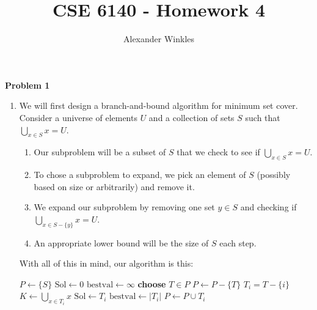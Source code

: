 \documentclass{article}
\title{CSE 6140 - Homework 4}
\author{Alexander Winkles}
\date{}
\newcommand{\Problem}[1]{\textbf{\large Problem #1}}
\begin{document}
\maketitle

\vspace{2in}



\newpage

\Problem{1}

\begin{enumerate}
\item We will first design a branch-and-bound algorithm for minimum set cover.
Consider a universe of elements $U$ and a collection of sets $S$ such that $\bigcup_{x \in S} x = U$. 
\begin{enumerate}
\item Our subproblem will be a subset of $S$ that we check to see if $\bigcup_{x \in S} x = U$.
\item To chose a subproblem to expand, we pick an element of $S$ (possibly based on size or arbitrarily) and remove it. 
\item We expand our subproblem by removing one set $y \in S$ and checking if $\bigcup_{x \in S-\{y\}} x = U$. 
\item An appropriate lower bound will be the size of $S$ each step. 
\end{enumerate}

With all of this in mind, our algorithm is this: 

\begin{algorithm}[H]
\begin{algorithmic}[1]
\State $P \gets \{S\}$ 
\State $\text{Sol} \gets 0$ 
\State $\text{bestval} \gets \infty$ 
\State \textbf{choose} $T \in P$ 
\State $P \gets P - \{T\}$ 
 
\State $T_i = T-\{i\}$
\EndFor
{}
\State $K \gets \bigcup_{x\in T_i} x$
 
\State $\text{Sol} \gets T_i$ 
\State $\text{bestval} \gets |T_i|$ 
\EndIf
{} 
\State $P \gets P \cup T_i$
\EndIf
\EndFor
\EndWhile
\State {}
\EndProcedure
\end{algorithmic}
\end{algorithm}


\end{enumerate}
\end{document}
